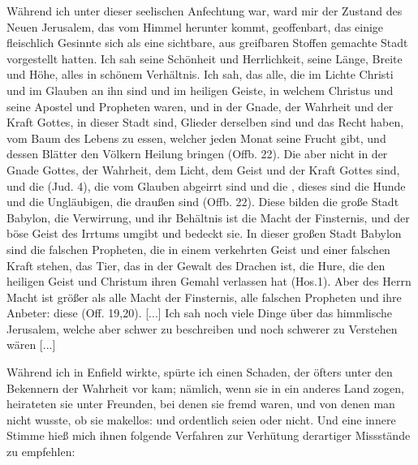 Während ich unter dieser seelischen Anfechtung war, ward
mir der Zustand des Neuen Jerusalem, das vom Himmel herunter
kommt, geoffenbart, das einige fleischlich Gesinnte sich als eine
sichtbare, aus greifbaren Stoffen gemachte Stadt vorgestellt hatten.
Ich sah seine Schönheit und Herrlichkeit, seine Länge, Breite und
Höhe, alles in schönem Verhältnis. Ich sah, das alle, die im
Lichte Christi und im Glauben an ihn sind und im heiligen
Geiste, in welchem Christus und seine Apostel und Propheten
waren, und in der Gnade, der Wahrheit und der Kraft Gottes,
in dieser Stadt sind, Glieder derselben sind und das Recht haben,
vom Baum des Lebens zu essen, welcher jeden Monat seine Frucht
gibt, und dessen Blätter den Völkern Heilung bringen (Offb. 22).
Die aber nicht in der Gnade Gottes, der Wahrheit, dem Licht,
dem Geist und der Kraft Gottes sind, und die  (Jud. 4),
die vom Glauben abgeirrt sind und die , dieses sind die Hunde
und die Ungläubigen, die draußen sind (Offb. 22). Diese bilden
die große Stadt Babylon, die Verwirrung, und ihr Behältnis ist
die Macht der Finsternis, und der böse Geist des Irrtums umgibt
und bedeckt sie. In dieser großen Stadt Babylon sind die
falschen Propheten, die in einem verkehrten Geist und einer
falschen Kraft stehen, das Tier, das in der Gewalt des Drachen
ist, die Hure, die den heiligen Geist und Christum ihren Gemahl
verlassen hat (Hos.1). Aber des Herrn Macht ist größer als
alle Macht der Finsternis, alle falschen Propheten und ihre Anbeter: 
diese  (Off. 19,20). [...]
Ich sah noch viele Dinge über das himmlische Jerusalem, welche
aber schwer zu beschreiben und noch schwerer zu Verstehen wären [...]

Während ich in Enfield wirkte, spürte ich einen Schaden,
der öfters unter den Bekennern der Wahrheit vor kam; nämlich,
wenn sie in ein anderes Land zogen, heirateten sie unter Freunden,
bei denen sie fremd waren, und von denen man nicht wusste, ob sie
makellos: und ordentlich seien oder nicht. Und eine innere Stimme
hieß mich ihnen folgende Verfahren zur Verhütung derartiger
Missstände zu empfehlen:

